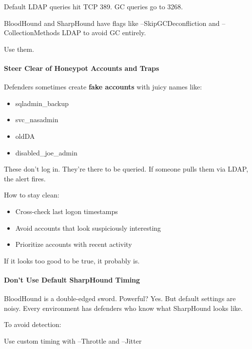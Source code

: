 Default LDAP queries hit TCP 389. GC queries go to 3268.

BloodHound and SharpHound have flags like --SkipGCDeconfliction and --CollectionMethods LDAP to avoid GC entirely.

Use them.

\paragraph{\textbf{   Steer Clear of Honeypot Accounts and Traps}}

Defenders sometimes create \textbf{fake accounts} with juicy names like:

\begin{itemize}
    \item sqladmin\_backup

    \item svc\_nasadmin

    \item oldDA

    \item disabled\_joe\_admin

\end{itemize}
These don’t log in. They’re there to be queried. If someone pulls them via LDAP, the alert fires.

How to stay clean:

\begin{itemize}
    \item Cross-check last logon timestamps

    \item Avoid accounts that look suspiciously interesting

    \item Prioritize accounts with recent activity

\end{itemize}
If it looks too good to be true, it probably is.

\paragraph{\textbf{   Don’t Use Default SharpHound Timing}}

BloodHound is a double-edged sword. Powerful? Yes. But default settings are noisy. Every environment has defenders who know what SharpHound looks like.

To avoid detection:

Use custom timing with --Throttle and --Jitter

